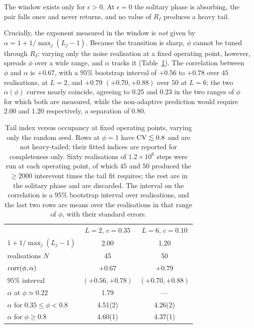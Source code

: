 \documentclass[aps,pre,twocolumn,superscriptaddress,floatfix,longbibliography]{revtex4-2}
\begin{document}
The window exists only for $\epsilon>0$. At $\epsilon=0$ the solitary phase is
absorbing, the pair falls once and never returns, and no value of $R_I$ produces
a heavy tail.

Crucially, the exponent measured in the window is \emph{not} given by
$\alpha=1+1/\max_j(L_j-1)$. Because the transition is sharp, $\phi$ cannot be
tuned through $R_I$; varying only the noise realisation at a fixed operating
point, however, spreads $\phi$ over a wide range, and $\alpha$ tracks it
(Table~\ref{tab:occ}). The correlation between $\phi$ and $\alpha$ is
$+0.67$, with a $95\%$ bootstrap interval of $+0.56$ to $+0.78$ over $45$
realisations, at $L=2$, and $+0.79$ $(+0.70,+0.88)$ over $50$ at
$L=6$; the two $\alpha(\phi)$ curves
nearly coincide, agreeing to $0.25$ and $0.23$ in the two ranges of $\phi$
for which both are measured, while the non-adaptive prediction would require
$2.00$ and $1.20$ respectively, a separation of $0.80$.

\begin{table}[t]
\caption{Tail index versus occupancy at fixed operating points, varying only the
random seed. Rows at $\phi=1$ have ${\rm CV}\lesssim0.8$ and are not
heavy-tailed; their fitted indices are reported for completeness only.
Sixty realisations of $1.2\times10^{6}$ steps were run at each operating
point, of which $45$ and $50$ produced the $\ge2000$ interevent times the tail
fit requires; the rest are in the solitary phase and are discarded. The interval
on the correlation is a $95\%$ bootstrap interval over realisations, and the
last two rows are means over the realisations in that range of $\phi$, with
their standard errors.}
\label{tab:occ}
\begin{ruledtabular}
\begin{tabular}{lcc}
 & $L=2$, $c=0.35$ & $L=6$, $c=0.10$ \\
\colrule
$1+1/\max_j(L_j{-}1)$ & 2.00 & 1.20 \\
realisations $N$ & 45 & 50 \\
${\rm corr}(\phi,\alpha)$ & $+0.67$  & $+0.79$  \\
\quad $95\%$ interval & $(+0.56,+0.78)$ & $(+0.70,+0.88)$ \\
$\alpha$ at $\phi\simeq0.22$ & 1.79 & --- \\
$\alpha$ for $0.35\le\phi<0.8$
  & 4.51(2)  & 4.26(2)  \\
$\alpha$ for $\phi\ge0.8$
  & 4.60(1)  & 4.37(1)  \\
\end{tabular}
\end{ruledtabular}
\end{table}
\end{document}

